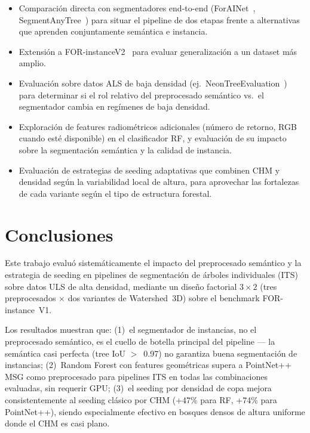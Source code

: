 \documentclass[runningheads]{llncs}
\begin{document}
\begin{itemize}
  \item Comparaci\'on directa con segmentadores end-to-end (ForAINet~\cite{henrich2024}, SegmentAnyTree~\cite{wielgosz2024}) para situar el pipeline de dos etapas frente a alternativas que aprenden conjuntamente sem\'antica e instancia.
  \item Extensi\'on a FOR-instanceV2~\cite{xiang2025} para evaluar generalizaci\'on a un dataset m\'as amplio.
  \item Evaluaci\'on sobre datos ALS de baja densidad (ej.\ NeonTreeEvaluation~\cite{weinstein2021}) para determinar si el rol relativo del preprocesado sem\'antico vs.\ el segmentador cambia en reg\'imenes de baja densidad.
  \item Exploraci\'on de features radiom\'etricos adicionales (n\'umero de retorno, RGB cuando est\'e disponible) en el clasificador RF, y evaluaci\'on de su impacto sobre la segmentaci\'on sem\'antica y la calidad de instancia.
  \item Evaluaci\'on de estrategias de seeding adaptativas que combinen CHM y densidad seg\'un la variabilidad local de altura, para aprovechar las fortalezas de cada variante seg\'un el tipo de estructura forestal.
\end{itemize}

\section{Conclusiones}\label{sec:conclusions}

Este trabajo evalu\'o sistem\'aticamente el impacto del preprocesado sem\'antico y la estrategia de seeding en pipelines de segmentaci\'on de \'arboles individuales (ITS) sobre datos ULS de alta densidad, mediante un dise\~no factorial $3 \times 2$ (tres preprocesados $\times$ dos variantes de Watershed~3D) sobre el benchmark FOR-instance~V1.

Los resultados muestran que: (1)~el segmentador de instancias, no el preprocesado sem\'antico, es el cuello de botella principal del pipeline --- la sem\'antica casi perfecta (tree IoU $>$~0.97) no garantiza buena segmentaci\'on de instancias; (2)~Random Forest con features geom\'etricas supera a PointNet++ MSG como preprocesado para pipelines ITS en todas las combinaciones evaluadas, sin requerir GPU; (3)~el seeding por densidad de copa mejora consistentemente al seeding cl\'asico por CHM (+47\% para RF, +74\% para PointNet++), siendo especialmente efectivo en bosques densos de altura uniforme donde el CHM es casi plano.
\end{document}
